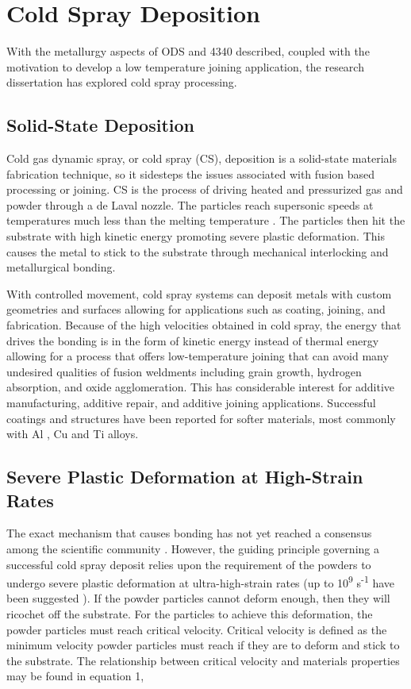 	


\section*{Cold Spray Deposition}

	With the metallurgy aspects of ODS and 4340 described, coupled with the motivation to develop a low temperature joining application, the research dissertation has explored cold spray processing.

	\subsection*{Solid-State Deposition}

		Cold gas dynamic spray, or cold spray (CS), deposition is a solid-state materials fabrication technique, so it sidesteps the issues associated with fusion based processing or joining. CS is the process of driving heated and pressurized gas and powder through a de Laval nozzle. The particles reach supersonic speeds at temperatures much less than the melting temperature \cite{RN435}. The particles then hit the substrate with high kinetic energy promoting severe plastic deformation. This causes the metal to stick to the substrate through mechanical interlocking and metallurgical bonding. 
		
		With controlled movement, cold spray systems can deposit metals with custom geometries and surfaces allowing for applications such as coating, joining, and fabrication. Because of the high velocities obtained in cold spray, the energy that drives the bonding is in the form of kinetic energy instead of thermal energy allowing for a process that offers low-temperature joining that can avoid many undesired qualities of fusion weldments including grain growth, hydrogen absorption, and oxide agglomeration. This has considerable interest for additive manufacturing, additive repair, and additive joining applications. Successful coatings and structures have been reported for softer materials, most commonly with Al \cite{RN796, RN147, RN1296, RN192}, Cu \cite{RN892, RN1172, RN2278}  and Ti \cite{RN461, RN571, RN678} alloys.

	\subsection*{Severe Plastic Deformation at High-Strain Rates}

		The exact mechanism that causes bonding has not yet reached a consensus among the scientific community \cite{RN1687, RN1292, RN3402, RN3403}. However, the guiding principle governing a successful cold spray deposit relies upon the requirement of the powders to undergo severe plastic deformation at ultra-high-strain rates (up to 10\textsuperscript{9 }s\textsuperscript{-1} have been suggested \cite{RN1687}). If the powder particles cannot deform enough, then they will ricochet off the substrate. For the particles to achieve this deformation, the powder particles must reach critical velocity. Critical velocity is defined as the minimum velocity powder particles must reach if they are to deform and stick to the substrate. The relationship between critical velocity and materials properties may be found in equation 1,
		
